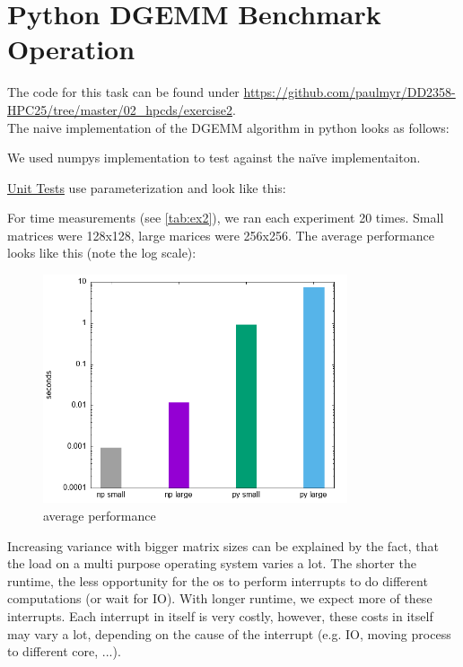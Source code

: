 \documentclass[a4paper,12pt]{article}
\begin{document}
\section{Python DGEMM Benchmark Operation}
The code for this task can be found under
\url{https://github.com/paulmyr/DD2358-HPC25/tree/master/02_hpcds/exercise2}.\\
The naive implementation of the DGEMM algorithm in python looks as follows:

We used numpys implementation to test against the naïve implementaiton.

\href{https://github.com/paulmyr/DD2358-HPC25/tree/master/02_hpcds/exercise2/test_exercise2.py}{Unit Tests} use parameterization and look like this:

For time measurements (see \ref{tab:ex2}), we ran each experiment 20 times.
Small matrices were 128x128, large marices were 256x256.
The average performance looks like this (note the log scale):
\begin{figure}[H]
  \centering
  \includegraphics[width=0.8\textwidth]{exercise2/graph.png}
  \caption{average performance}
\end{figure}
Increasing variance with bigger matrix sizes can be explained by the fact, that the load on a multi purpose operating system varies a lot.
The shorter the runtime, the less opportunity for the os to perform interrupts to do different computations (or wait for IO).
With longer runtime, we expect more of these interrupts.
Each interrupt in itself is very costly, however, these costs in itself may vary a lot, depending on the cause of the interrupt (e.g. IO, moving process to different core, ...).
\end{document}
